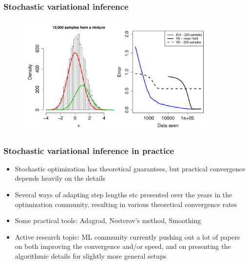 \documentclass{beamer}
\begin{document}
\begin{frame}
  \frametitle{Stochastic variational inference}

  \begin{figure}
  \begin{center}
  \includegraphics[width=0.9\textwidth]{mixture3.pdf}
  \end{center}
  \end{figure}

\end{frame}

\begin{frame}
  \frametitle{Stochastic variational inference in practice}

  \begin{itemize}
  \item Stochastic optimization has theoretical guarantees, but
    practical convergence depends heavily on the details
  \item Several ways of adapting step lengths etc presented over
    the years in the optimization community, resulting in various
    theoretical convergence rates
  \item Some practical tools: Adagrad, Nesterov's method, Smoothing
  \item Active research topic: ML community currently pushing out
    a lot of papers on both improving the convergence and/or speed,
    and on presenting the algorithmic details for slightly more general setups
  \end{itemize}
\end{frame}




\end{document}

